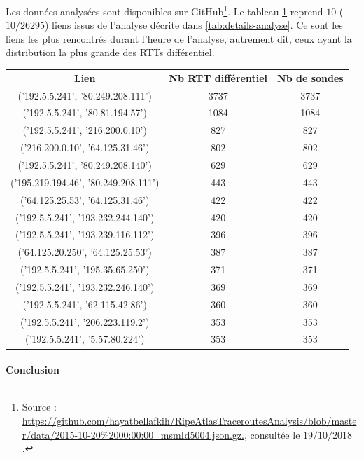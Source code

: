 Les données analysées sont disponibles sur GitHub\footnote{Source : \url{ https://github.com/hayatbellafkih/RipeAtlasTraceroutesAnalysis/blob/master/data/2015-10-20\%2000:00:00\_msmId5004.json.gz.}, consultée le $19/10/2018$. }. Le tableau 	\ref{tab:resultat-analyse} reprend $ 10 $ ($ 10/26295 $) liens issus de l'analyse décrite dans \ref{tab:details-analyse}. Ce sont les liens les plus rencontrés durant l'heure de l'analyse, autrement dit, ceux ayant la distribution la plus grande des RTTs différentiel.


\begin{table}[H]
	\centering
	\begin{tabular}{c c c}
	\textbf{Lien}	& \textbf{Nb RTT différentiel}& \textbf{Nb de sondes}\\
 ('192.5.5.241', '80.249.208.111') &	3737 &	3737 \\ \hline
 ('192.5.5.241', '80.81.194.57')  &	 1084 &	1084\\ \hline
 ('192.5.5.241', '216.200.0.10')  &	827 &	827\\ \hline
 ('216.200.0.10', '64.125.31.46')  &	802 &	802\\ \hline
 ('192.5.5.241', '80.249.208.140')  &	629 &	629\\ \hline
 ('195.219.194.46', '80.249.208.111')  &	443 &	443\\ \hline
 ('64.125.25.53', '64.125.31.46')  &	422 &	422\\ \hline
 ('192.5.5.241', '193.232.244.140')  &	420 &	420\\ \hline
 ('192.5.5.241', '193.239.116.112')  &	396 &	396\\ \hline
 ('64.125.20.250', '64.125.25.53') 	 &387 &	387\\ \hline
 ('192.5.5.241', '195.35.65.250')  &	371 &	371\\ \hline
 ('192.5.5.241', '193.232.246.140')  &	369	 &369\\ \hline
 ('192.5.5.241', '62.115.42.86')  &	360	 &360\\ \hline
 ('192.5.5.241', '206.223.119.2')  &	353	 &353\\ \hline
 ('192.5.5.241', '5.57.80.224')  &	353	 &353\\ \hline
	\end{tabular}
	\label{tab:resultat-analyse}
\end{table}

\paragraph{Conclusion}

